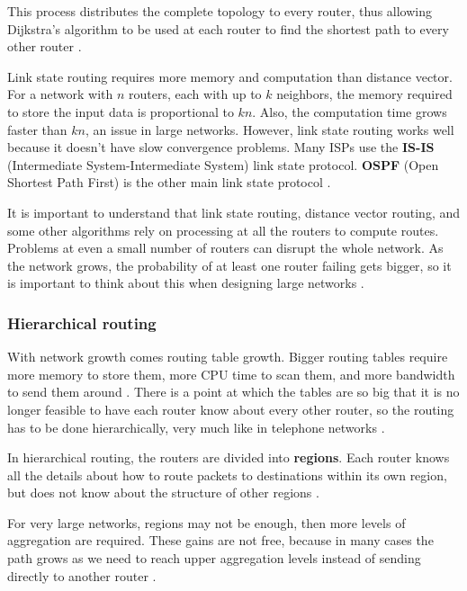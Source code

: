 This process distributes the complete topology to every router, thus allowing Dijkstra's algorithm to be used at each router to find the shortest path to every other router \cite[p.~374]{computer-networks-tanenbaum-2012}.

Link state routing requires more memory and computation than distance vector.
For a network with \(n\) routers, each with up to \(k\) neighbors, the memory required to store the input data is proportional to \(kn\). Also, the computation time grows faster than \(kn\), an issue in large networks.
However, link state routing works well because it doesn't have slow convergence problems.
Many ISPs use the \textbf{IS-IS} (Intermediate System-Intermediate System) link state protocol.
\textbf{OSPF} (Open Shortest Path First) is the other main link state protocol \cite[p.~378]{computer-networks-tanenbaum-2012}.

It is important to understand that link state routing, distance vector routing, and some other algorithms rely on processing at all the routers to compute routes. Problems at even a small number of routers can disrupt the whole network. As the network grows, the probability of at least one router failing gets bigger, so it is important to think about this when designing large networks \cite[p.~378]{computer-networks-tanenbaum-2012}.

\subsubsection{Hierarchical routing}\label{Hierarchical routing}

With network growth comes routing table growth.
Bigger routing tables require more memory to store them, more CPU time to scan them, and more bandwidth to send them around \cite[p.~378]{computer-networks-tanenbaum-2012}.
There is a point at which the tables are so big that it is no longer feasible to have each router know about every other router, so the routing has to be done hierarchically, very much like in telephone networks \cite[p.~379]{computer-networks-tanenbaum-2012}.

In hierarchical routing, the routers are divided into \textbf{regions}.
Each router knows all the details about how to route packets to destinations within its own region, but does not know about the structure of other regions \cite[p.~379]{computer-networks-tanenbaum-2012}.

For very large networks, regions may not be enough, then more levels of aggregation are required.
These gains are not free, because in many cases the path grows as we need to reach upper aggregation levels instead of sending directly to another router \cite[p.~379]{computer-networks-tanenbaum-2012}.

